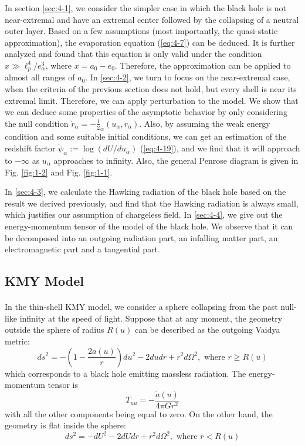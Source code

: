 \documentclass[letterpaper,12pt]{article}
\begin{document}
In section \ref{sec:4-1}, we consider the simpler case in which the black hole is not near-extremal and have an extremal center followed by the  collapsing of a neutral outer layer. Based on a few assumptions (most importantly, the quasi-static approximation), the evaporation equation (\ref{eq:4-7}) can be deduced. It is further analyzed and found that this equation is only valid under the condition $x \gg \ell_{p}^{4} \slash e_{\alpha}^{3}$, where $x = a_{0} - e_{0}$. Therefore, the approximation can be applied to almost all ranges of $a_{0}$. In \ref{sec:4-2}, we turn to focus on the near-extremal case, when the criteria of the previous section does not hold, but every shell is near its extremal limit. Therefore, we can apply perturbation to the model. We show that we can deduce some properties of the asymptotic behavior by only considering the null condition $
\dot{r}_{\alpha} = -\frac{1}{2}_{\alpha}(u_{\alpha}, r_{\alpha})$. Also, by assuming the weak energy condition and some suitable initial conditions, we can get an estimation of the redshift factor $\tilde{\psi}_{\alpha} := \log (dU/du_{\alpha})$ (\ref{eq:4-19}), and we find that it will approach to $-\infty$ as $u_{\alpha}$ approaches to infinity. Also, the general Penrose diagram is given in Fig. \ref{fig:1-2} and Fig. \ref{fig:1-1}.  

In \ref{sec:4-3}, we calculate the Hawking radiation of the black hole based on the result we derived previously, and find that the Hawking radiation is always small, which justifies our assumption of chargeless field. In \ref{sec:4-4}, we give out the energy-momentum tensor of the model of the black hole. We observe that it can be decomposed into an outgoing radiation part, an infalling matter part, an electromagnetic part and a tangential part. 

\subsection{KMY Model}\label{sec:1-1}
\paragraph{ }
In the thin-shell KMY model, we consider a sphere collapsing from the past null-like infinity at the speed of light. Suppose that at any moment, the geometry outside the sphere of radius $R(u)$ can be described as the outgoing Vaidya metric:\cite{ kawai2013self,vaidya1951gravitational}
\begin{equation}
ds^{2} = -\left(1-\frac{2a(u)}{r} \right)du^{2}-2dudr +r^{2}d\Omega^2, \textrm{ where $r \geq R(u)$}
\end{equation}
which corresponds to a black hole emitting massless radiation. The energy-momentum tensor is
\begin{equation}\label{eq:a}
  T_{uu} =-\frac{\dot{a}(u)}{4\pi G r^{2}}
\end{equation}
with all the other components being equal to zero.
On the other hand, the geometry is flat inside the sphere:
\begin{equation}
ds^{2} = -dU^{2}-2dUdr +r^{2}d\Omega^2, \textrm{ where $r < R(u)$}
\end{equation}
\end{document}
